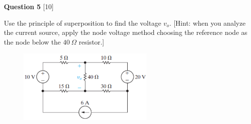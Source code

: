 \documentclass[12pt]{article}
\begin{document}
\newpage
\noindent
{\bf Question 5} [10]

Use the principle of superposition to find the voltage $v_{o}$. [Hint: when you analyze the current source, apply the node voltage method choosing the reference node as the node below the $40~\Omega$ resistor.]
\begin{figure}[h!]
\centering 
\includegraphics[clip,width=0.6\textwidth]{Fig4-94.png}
\end{figure}
\end{document}
